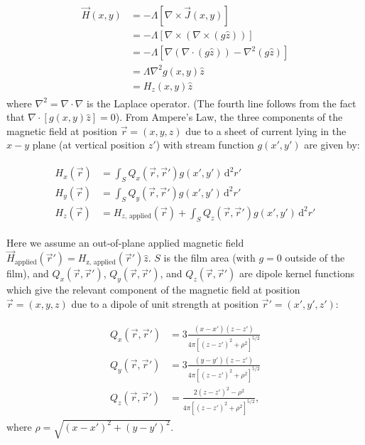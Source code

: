 \documentclass[preprint,12pt]{elsarticle}
\newcounter{bla}
\begin{document}
\begin{align}
    \label{eq:london_stream}
    \begin{split}
        \vec{H}(x, y) &= -\Lambda\left[\nabla\times\vec{J}(x, y)\right]\\
        &= -\Lambda\left[\nabla\times\left(\nabla\times(g\hat{z})\right)\right]\\
        &= -\Lambda\left[\nabla(\nabla\cdot(g\hat{z}))-\nabla^2(g\hat{z})\right]\\
        &=\Lambda\nabla^2g(x,y)\hat{z}\\
        &=H_z(x, y)\hat{z}
    \end{split}
\end{align}
where $\nabla^2=\nabla\cdot\nabla$ is the Laplace operator. (The fourth line follows from the fact that $\nabla\cdot\left[g(x,y)\hat{z}\right] = 0$). From Ampere's Law, the three components of the magnetic field at position $\vec{r}=(x, y, z)$ due to a sheet of current lying in the $x-y$ plane (at vertical position $z'$) with stream function $g(x', y')$ are given by:

\begin{align}
    \label{eq:field_from_kernel}
    \begin{split}
        H_x(\vec{r}) &= \int_S Q_x(\vec{r},\vec{r}')g(x', y')\,\mathrm{d}^2r'\\
        H_y(\vec{r}) &= \int_S Q_y(\vec{r},\vec{r}')g(x', y')\,\mathrm{d}^2r'\\
        H_z(\vec{r}) &= H_{z,\,\mathrm{applied}}(\vec{r})
        + \int_S Q_z(\vec{r},\vec{r}')g(x', y')\,\mathrm{d}^2r'  
    \end{split}
\end{align}

Here we assume an out-of-plane applied magnetic field $\vec{H}_\mathrm{applied}(\vec{r}')=H_\mathrm{z,\,\mathrm{applied}}(\vec{r}')\hat{z}$. $S$ is the film area (with $g = 0$ outside of the film), and $Q_x(\vec{r},\vec{r}')$, $Q_y(\vec{r},\vec{r}')$, and $Q_z(\vec{r},\vec{r}')$ are dipole kernel functions which give the relevant component of the magnetic field at position $\vec{r}=(x, y, z)$ due to a dipole of unit strength at position $\vec{r}'=(x', y', z')$:

\begin{align}
    \label{eq:kernels}
    \begin{split}
        Q_x(\vec{r}, \vec{r}') &=  3\frac{(x-x')(z-z')}
        {4\pi[(z-z')^2+\rho^2]^{5/2}}\\
        Q_y(\vec{r}, \vec{r}') &=  3\frac{(y-y')(z-z')}
        {4\pi[(z-z')^2+\rho^2]^{5/2}}\\
        Q_z(\vec{r}, \vec{r}') &=  \frac{2(z-z')^2-\rho^2}
        {4\pi[(z-z')^2+\rho^2]^{5/2}},
    \end{split}
\end{align}
where $\rho=\sqrt{(x-x')^2 + (y-y')^2}$.
\end{document}
